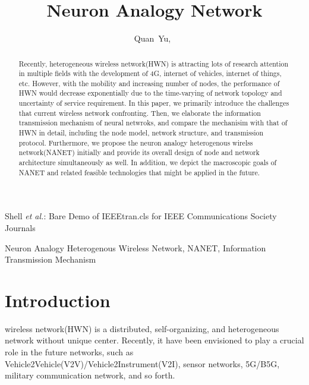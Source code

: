 \documentclass[journal,comsoc]{IEEEtran}
\begin{document}
	
	\title{Neuron Analogy Network}
	
	\author{Quan~Yu,~}	
	{Shell \MakeLowercase{\textit{et al.}}: Bare Demo of IEEEtran.cls for IEEE Communications Society Journals}
	\maketitle
	
	\begin{abstract}
		Recently, heterogeneous wireless network(HWN) is attracting lots of research attention in multiple fields with the development of 4G, internet of vehicles, internet of things, etc. 
		However, with the mobility and increasing number of nodes, the performance of HWN would decrease exponentially due to the time-varying of network topology and uncertainty of service requirement. 
		In this paper, we primarily introduce the challenges that current wireless network confronting.
		Then, we elaborate the information transmission mechanism of neural netwroks, 
		and compare the mechanisim with that of HWN in detail, 
		including the node model, network structure, and transmission protocol. 
		Furthermore, we propose the neuron analogy heterogenous wirelss network(NANET) initially and provide its overall design of node and network architecture simultaneously as well.
		In addition, we depict the macroscopic goals of NANET  and related feasible technologies that might be applied in the future.
	\end{abstract}
	
	\begin{IEEEkeywords}
		Neuron Analogy Heterogenous Wireless Network, NANET, 
		Information Transmission Mechanism
	\end{IEEEkeywords}
	
	\IEEEpeerreviewmaketitle
	
	\section{Introduction}
	\label{section: introduction}
	 wireless network(HWN) is a distributed, self-organizing, and heterogeneous network without unique center.
		Recently, it have been envisioned to play a crucial role in the future networks, 
		such as Vehicle2Vehicle(V2V)/Vehicle2Instrument(V2I), sensor networks, 5G/B5G, military communication network, and so forth.
		
\end{document}
